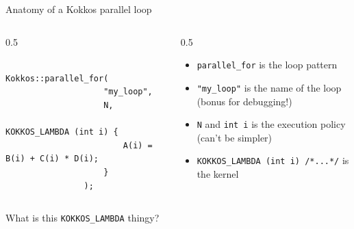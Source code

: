 \documentclass[
    aspectratio=169,
    \createHandout
]{beamer}
\begin{document}
\begin{frame}[fragile]{Anatomy of a Kokkos parallel loop}
    \begin{columns}
        \begin{column}{0.5\linewidth}
            \begin{verbatim}
                Kokkos::parallel_for(
                    "my_loop",
                    N,
                    KOKKOS_LAMBDA (int i) {
                        A(i) = B(i) + C(i) * D(i);
                    }
                );
            \end{verbatim}
        \end{column}
        \begin{column}{0.5\linewidth}
            \begin{itemize}
                \item \texttt{parallel_for} is the loop pattern
                \item \texttt{"my_loop"} is the name of the loop (bonus for debugging!)
                \item \texttt{N} and \texttt{int i} is the execution policy (can't be simpler)
                \item \texttt{KOKKOS_LAMBDA (int i) {/*...*/}} is the kernel
            \end{itemize}
        \end{column}
    \end{columns}

    \pause

    \vspace{1em}
     What is this \texttt{KOKKOS\_LAMBDA} thingy?
\end{frame}

\end{document}
